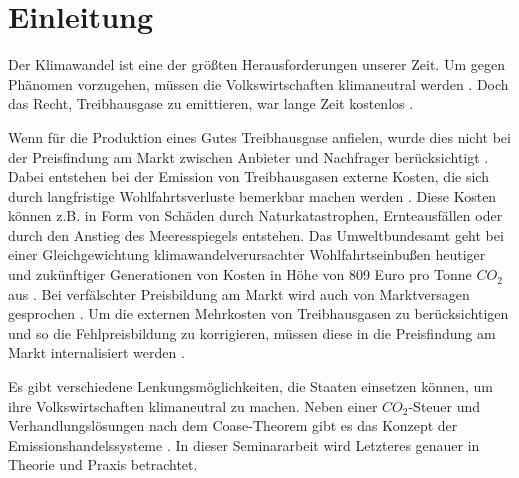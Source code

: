 \chapter{Einleitung}

Der Klimawandel ist eine der größten Herausforderungen unserer Zeit. Um gegen Phänomen vorzugehen, müssen die Volkswirtschaften klimaneutral werden \cite[S. 162]{hubert.2020}.
Doch das Recht, Treibhausgase zu emittieren, war lange Zeit kostenlos .

Wenn für die Produktion eines Gutes Treibhausgase anfielen, wurde dies nicht bei der Preisfindung am Markt zwischen Anbieter und Nachfrager berücksichtigt \cite[S. 161]{hubert.2020}.
Dabei entstehen bei der Emission von Treibhausgasen externe Kosten, die sich durch langfristige Wohlfahrtsverluste bemerkbar machen werden \cite[S. 25]{rabe.2018} \cite{ub4.2023}.
Diese Kosten können z.B. in Form von Schäden durch Naturkatastrophen, Ernteausfällen oder durch den Anstieg des Meeresspiegels entstehen.
Das Umweltbundesamt geht bei einer Gleichgewichtung klimawandelverursachter Wohlfahrtseinbußen heutiger und zukünftiger Generationen von Kosten in Höhe von 809 Euro pro Tonne $CO_2$ aus \cite{ub4.2023}.
Bei verfälschter Preisbildung am Markt wird auch von Marktversagen gesprochen \cite[S. 268]{hubert.2019}.
Um die externen Mehrkosten von Treibhausgasen zu berücksichtigen und so die Fehlpreisbildung zu korrigieren, müssen diese in die Preisfindung am Markt internalisiert werden \cite[S. 161]{hubert.2020}.

Es gibt verschiedene Lenkungsmöglichkeiten, die Staaten einsetzen können, um ihre Volkswirtschaften klimaneutral zu machen.
Neben einer $CO_2$-Steuer und Verhandlungslösungen nach dem Coase-Theorem gibt es das Konzept der Emissionshandelssysteme \cite[S. 161]{hubert.2020}.
In dieser Seminararbeit wird Letzteres genauer in Theorie und Praxis betrachtet.